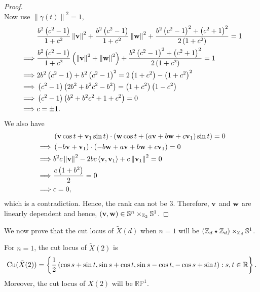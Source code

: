 \begin{proof}
\begin{equation*}
	\end{equation*}
	Now use $\left\|\gamma(t)\right\|^2=1$,
	\begin{align*}
		& \frac{b^2\left(c^2-1\right)}{1+c^2} \left\|\mathbf{v}\right\|^2 + \frac{b^2 \left(c^2-1\right)}{1+c^2}\left\|\mathbf{w}\right\|^2 + \frac{b^2 \left(c^2-1\right)^2 + \left(c^2+1\right)^2}{2 \left(1+c^2\right)}=1 \\
		\implies & \frac{b^2\left(c^2-1\right)}{1+c^2}\left(\left\|\mathbf{v}\right\|^2+\left\|\mathbf{w}\right\|^2\right)+ \frac{b^2 \left(c^2-1\right)^2 + \left(c^2+1\right)^2}{2 \left(1+c^2\right)}=1 \\ 
		\implies & 2b^2 \left(c^2-1\right) + b^2 \left(c^2-1\right)^2 = 2 \left(1+c^2\right)-\left(1+c^2\right)^2 \\ 
		\implies & \left(c^2-1\right)\left(2b^2+b^2c^2-b^2\right)= \left(1+c^2\right)\left(1-c^2\right) \\ 
		\implies & \left(c^2-1\right)\left(b^2+b^2c^2+1+c^2\right)=0 \\
		\implies & c= \pm 1.
	\end{align*}
	We also have 
	\begin{align*}
		& \left(\mathbf{v}\cos t+\mathbf{v}_1\sin t\right)\cdot \left(\mathbf{w} \cos t+ \left(a\mathbf{v}+b\mathbf{w}+c\mathbf{v}_1\right)\sin t\right)=0 \\
		\implies & \left(-b\mathbf{v}+\mathbf{v}_1\right)\cdot \left(-b \mathbf{w}+a\mathbf{v}+b\mathbf{w}+c\mathbf{v}_1\right)=0 \\
		\implies & b^2c \left\|\mathbf{v}\right\|^2-2bc \left\langle \mathbf{v},\mathbf{v}_1 \right\rangle+ c \left\|\mathbf{v}_1\right\|^2 = 0 \\ 
		\implies & \frac{c \left(1+b^2\right)}{2}=0 \\ 
		\implies & c = 0,
	\end{align*}
	which is a contradiction. Hence, the rank can not be $3$. Therefore, $\mathbf{v}$ and $\mathbf{w}$ are linearly dependent and hence, $(\mathbf{v},\mathbf{w})\in \mathbb{S}^n\times_{\mathbb{Z}_2}\mathbb{S}^1$. 
\end{proof}

We now prove that the cut locus of $\tilde{X}(d)$ when $n=1$ will be $\left(\mathbb{Z}_d\star \mathbb{Z}_d\right) \times_{\mathbb{Z}_d} \mathbb{S}^1$. 

\begin{note}[Cut locus of $X(2)$ for $n=1$] \label{note:cut-locus-of_X(2)-for_n=1}
	For $n=1$, the cut locus of $\tilde{X}(2)$ is
	\begin{equation*}
		\mathrm{Cu}(\tilde{X}(2))= \left\{\frac{1}{2} \left(\cos s+\sin t, \sin s+\cos t,\sin s-\cos t,-\cos s+\sin t\right):s,t\in \mathbb{R}\right\}.
	\end{equation*}
	Moreover, the cut locus of $X(2)$ will be $\mathbb{RP}^1$. 
\end{note}

